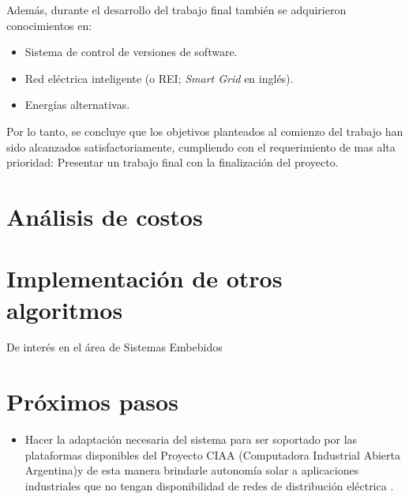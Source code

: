 \medskip

\noindent Además, durante el desarrollo del trabajo final también se adquirieron conocimientos en:

\begin{itemize}
	\item Sistema de control de versiones de software.
	\item Red eléctrica inteligente (o REI; \textit{Smart Grid} en inglés).
	\item Energías alternativas.	
\end{itemize}

\medskip

Por lo tanto, se concluye que los objetivos planteados al comienzo del trabajo han sido alcanzados satisfactoriamente, cumpliendo con el requerimiento de mas alta prioridad: Presentar un trabajo final con la finalización del proyecto.

\section{Análisis de costos}

\section{Implementación de otros algoritmos}
De interés en el área de Sistemas Embebidos
\section{Próximos pasos}

\begin{itemize}
	\item Hacer la adaptación necesaria del sistema para ser soportado por las plataformas disponibles del Proyecto CIAA (Computadora Industrial Abierta Argentina)y de esta manera brindarle autonomía solar a aplicaciones industriales que no tengan disponibilidad de redes de distribución eléctrica .
\end{itemize}






